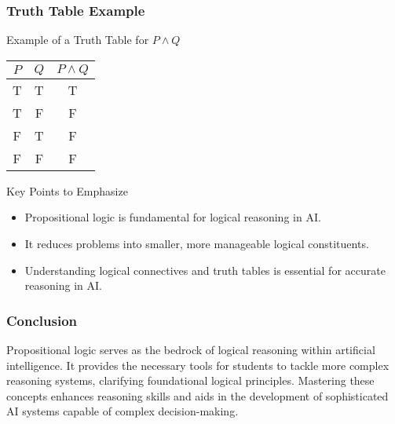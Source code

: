 \documentclass[aspectratio=169]{beamer}
\begin{document}
\begin{frame}[fragile]
    \frametitle{Truth Table Example}
    \begin{block}{Example of a Truth Table for $P \land Q$}
        \begin{center}
        \begin{tabular}{|c|c|c|}
            \hline
            $P$ & $Q$ & $P \land Q$ \\
            \hline
            T   & T   & T         \\
            T   & F   & F         \\
            F   & T   & F         \\
            F   & F   & F         \\
            \hline
        \end{tabular}
        \end{center}
    \end{block}

    \begin{block}{Key Points to Emphasize}
        \begin{itemize}
            \item Propositional logic is fundamental for logical reasoning in AI.
            \item It reduces problems into smaller, more manageable logical constituents.
            \item Understanding logical connectives and truth tables is essential for accurate reasoning in AI.
        \end{itemize}
    \end{block}
\end{frame}

\begin{frame}[fragile]
    \frametitle{Conclusion}
    Propositional logic serves as the bedrock of logical reasoning within artificial intelligence. It provides the necessary tools for students to tackle more complex reasoning systems, clarifying foundational logical principles. Mastering these concepts enhances reasoning skills and aids in the development of sophisticated AI systems capable of complex decision-making.
\end{frame}
\end{document}
